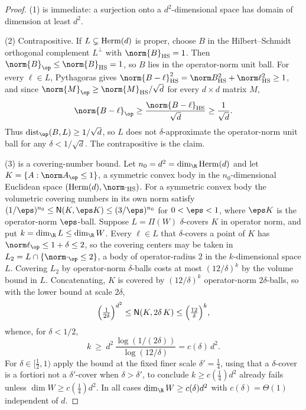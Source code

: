 \begin{proof}
(1) is immediate: a surjection onto a $d^2$-dimensional space has domain of
dimension at least $d^2$.

(2) Contrapositive. If $L\subsetneq\mathrm{Herm}(d)$ is proper, choose $B$ in the
Hilbert--Schmidt orthogonal complement $L^{\perp}$ with $\norm{B}_{\HS}=1$. Then
$\norm{B}_{\op}\le\norm{B}_{\HS}=1$, so $B$ lies in the operator-norm unit ball.
For every $\ell\in L$, Pythagoras gives
$\norm{B-\ell}_{\HS}^2=\norm B_{\HS}^2+\norm\ell_{\HS}^2\ge1$, and since
$\norm{M}_{\op}\ge\norm{M}_{\HS}/\sqrt d$ for every $d\times d$ matrix $M$,
\[
\norm{B-\ell}_{\op}\ge\frac{\norm{B-\ell}_{\HS}}{\sqrt d}\ge\frac1{\sqrt d}.
\]
Thus $\operatorname{dist}_{\op}(B,L)\ge 1/\sqrt d$, so $L$ does not
$\delta$-approximate the operator-norm unit ball for any $\delta<1/\sqrt d$. The
contrapositive is the claim.

(3) is a covering-number bound. Let $n_0=d^2=\dim_\R\Herm(d)$ and let
$K=\{A:\norm A_{\op}\le1\}$, a symmetric convex body in the $n_0$-dimensional
Euclidean space $(\Herm(d),\norm\cdot_{\HS})$. For a symmetric convex body the
volumetric covering numbers in its own norm satisfy
$(1/\eps)^{n_0}\le\cover(K,\eps K)\le(3/\eps)^{n_0}$ for $0<\eps<1$, where $\eps K$
is the operator-norm $\eps$-ball. Suppose $L=\Pi(W)$ $\delta$-covers $K$ in
operator norm, and put $k=\dim_\R L\le\dim_\R W$. Every $\ell\in L$ that
$\delta$-covers a point of $K$ has $\norm\ell_{\op}\le1+\delta\le2$, so the
covering centers may be taken in $L_2=L\cap\{\norm\cdot_{\op}\le2\}$, a body of
operator-radius $2$ in the $k$-dimensional space $L$. Covering $L_2$ by
operator-norm $\delta$-balls costs at most $(12/\delta)^k$ by the volume bound in
$L$. Concatenating, $K$ is covered by $(12/\delta)^k$ operator-norm $2\delta$-balls,
so with the lower bound at scale $2\delta$,
\[
\Big(\tfrac1{2\delta}\Big)^{d^2}\le\mathsf N(K,2\delta\,K)\le\Big(\tfrac{12}{\delta}\Big)^k,
\]
whence, for $\delta<1/2$,
\[
k\ \ge\ d^2\,\frac{\log(1/(2\delta))}{\log(12/\delta)}=c(\delta)\,d^2 .
\]
For $\delta\in[\tfrac12,1)$ apply the bound at the fixed finer scale
$\delta'=\tfrac14$, using that a $\delta$-cover is a fortiori not a $\delta'$-cover
when $\delta>\delta'$, to conclude $k\ge c(\tfrac14)d^2$ already fails unless
$\dim W\ge c(\tfrac14)d^2$. In all cases $\dim_\R W\ge c(\delta)d^2$ with
$c(\delta)=\Theta(1)$ independent of $d$.
\end{proof}

